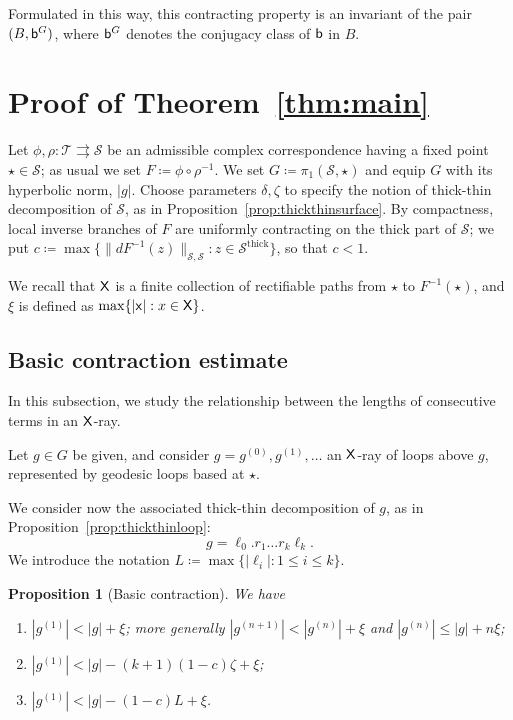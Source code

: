 \documentclass{amsart}
\newtheorem{prop}[thm]{Proposition}
\theoremstyle{definition}
\theoremstyle{remark}
\newcommand{\sfX}{{\sf X}}
\newcommand{\sfx}{{\sf x}}
\newcommand{\sfb}{{\sf b}}
\newcommand{\cT}{\mathcal{T}}
\newcommand{\cS}{\mathcal{S}}
\begin{document}
Formulated in this way, this contracting property is an invariant of the pair $(B,\sfb^G)$, where $\sfb^G$ denotes the conjugacy class of $\sfb$ in $B$.

\section{Proof of Theorem~\ref{thm:main}}\label{secn:proof}
Let $\phi, \rho\colon \cT \rightrightarrows\cS$ be an admissible complex correspondence having a fixed point $\star\in \cS$; as usual we set $F\coloneqq\phi \circ \rho^{-1}$.  We set $G\coloneqq\pi_1(\cS, \star)$ and equip $G$ with its hyperbolic norm, $|g|$. Choose parameters $\delta, \zeta$ to specify the notion of thick-thin decomposition of $\cS$, as in Proposition~\ref{prop:thickthinsurface}.  By compactness, local inverse branches of $F$ are uniformly contracting on the thick part of $\cS$; we put $c\coloneqq\max\{\|dF^{-1}(z)\|_{\cS, \cS} : z\in \cS^{\text{thick}}\}$, so that $c<1$. 

We recall that $\sfX$ is a finite collection of rectifiable paths from $\star$ to $F^{-1}(\star)$, and $\xi$ is defined as $\max\{|\sfx| : x\in \sfX\}$.

\subsection{Basic contraction estimate}\label{subsec:basic}
In this subsection, we study the relationship between the lengths of consecutive terms in an $\sfX$-ray.

Let $g\in G$ be given, and consider $g=g^{(0)}, g^{(1)}, \ldots$ an $\sfX$-ray of loops above $g$, represented by geodesic loops based at $\star$. 

We consider now the associated thick-thin decomposition of $g$, as in Proposition~\ref{prop:thickthinloop}:
\[ g=\ell_0.r_1\ldots r_k\ell_k.\]
We introduce the notation $L\coloneqq\max\{|\ell_i| : 1 \leq i \leq k\}$.  

\begin{prop}[Basic contraction]\label{prop:basic}
  We have 
\begin{enumerate}
\item $|g^{(1)}|<|g|+\xi$; more generally $|g^{(n+1)}|<|g^{(n)}|+\xi$ and $|g^{(n)}| \leq |g|+n\xi$;
\item $|g^{(1)}| < |g| - (k+1)(1-c)\zeta + \xi$;
\item $|g^{(1)}| < |g| - (1-c)L+\xi$.
\end{enumerate}
\end{prop}
\end{document}
